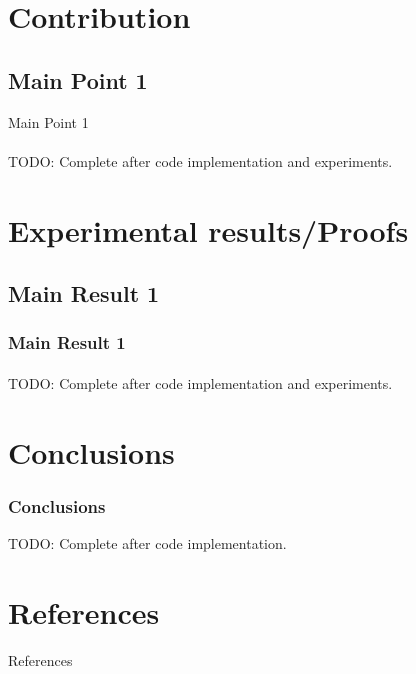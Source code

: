 \documentclass[11pt]{beamer}              %
\begin{document}
\section{Contribution}
\subsection{Main Point 1}
\begin{frame}{Main Point 1}
\framesubtitle{}

TODO: Complete after code implementation and experiments.

\note{
}
\end{frame}

\section{Experimental results/Proofs}

\subsection{Main Result 1}
\begin{frame}
\frametitle{Main Result 1}
\framesubtitle{}
TODO: Complete after code implementation and experiments.
\end{frame}


\section{Conclusions}
\begin{frame}
\frametitle{Conclusions}

TODO: Complete after code implementation.

\end{frame}

\section*{References}
\begin{frame}{References}
\tiny


\end{frame}
\end{document}
